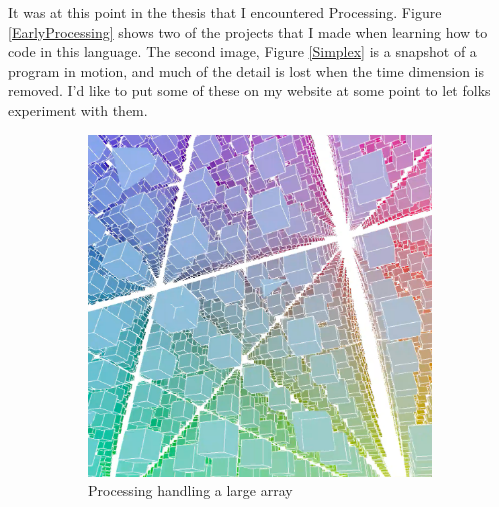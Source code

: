 \documentclass[12pt,twoside]{reedthesis}
\begin{document}
	It was at this point in the thesis that I encountered Processing. Figure \ref{EarlyProcessing} shows two of the projects that I made when learning how to code in this language. The second image, Figure \ref{Simplex} is a snapshot of a program in motion, and much of the detail is lost when the time dimension is removed. I'd like to put some of these on my website at some point to let folks experiment with them.
	
	\begin{figure}[H]
	\centering
	\begin{subfigure}{0.48\linewidth}
		\centering
		\includegraphics[width=\linewidth]{Images/ColorGrid}
		\caption{Processing handling a large array}
		\label{ColorGrid}
	\end{subfigure}%
	\hfill
	\begin{subfigure}{0.48\linewidth}
		\centering

\end{subfigure}
\end{figure}
\end{document}
